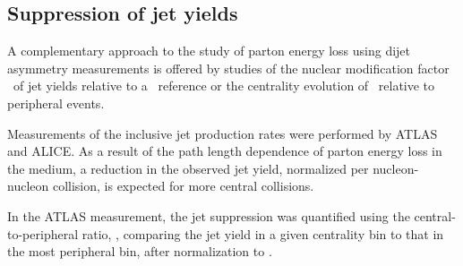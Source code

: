 \subsection{Suppression of jet yields}

A complementary approach to the study of parton energy loss using dijet asymmetry measurements
is offered by studies of the nuclear modification factor \Raa\ of jet yields relative 
to a \pp\ reference or the centrality evolution of \Rcp\ relative to peripheral events.

Measurements of the inclusive jet production rates were performed by ATLAS and ALICE.
As a result of the path length dependence of parton energy loss in the medium, 
\cite{Armesto:2011ht} a reduction in the observed jet yield, normalized per 
nucleon-nucleon collision, is expected for more central collisions.

In the ATLAS measurement, the jet suppression was quantified using the central-to-peripheral ratio, 
\Rcp, comparing the jet yield in a given centrality bin to that in the most peripheral bin, after 
normalization to \Ncoll.

